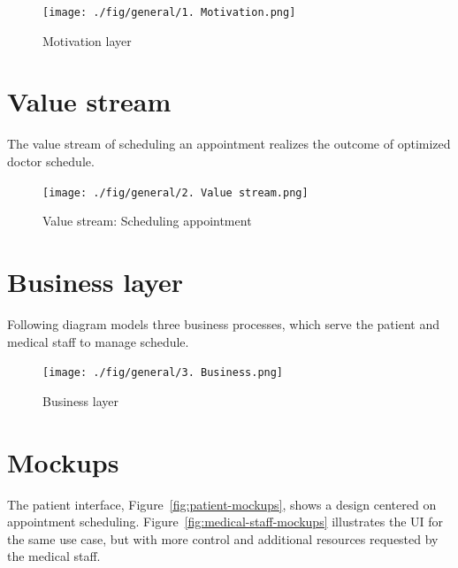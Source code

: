 \documentclass[11pt,english,a4paper,twoside]{article}
\begin{document}
\pagebreak
\begin{figure}[ht]
    \centering
    \texttt{[image: ./fig/general/1. Motivation.png]}
    \caption{Motivation layer}
    \label{fig:motivation}
\end{figure}

\pagebreak
\section{Value stream}

The value stream of scheduling an appointment realizes the outcome of optimized
doctor schedule.

\begin{figure}[ht]
    \centering
    \texttt{[image: ./fig/general/2. Value stream.png]}
    \caption{Value stream: Scheduling appointment}
    \label{fig:value_stream}
\end{figure}

\pagebreak
\section{Business layer}

Following diagram models three business processes, which serve the patient
and medical staff to manage schedule.

\begin{figure}[ht]
    \centering
    \texttt{[image: ./fig/general/3. Business.png]}
    \caption{Business layer}
    \label{fig:business}
\end{figure}


\section{Mockups}

The patient interface, Figure~\ref{fig:patient-mockups}, shows
a design centered on appointment scheduling.
Figure~\ref{fig:medical-staff-mockups} illustrates the UI for the
same use case, but with more control and additional resources requested
by the medical staff.
\end{document}
